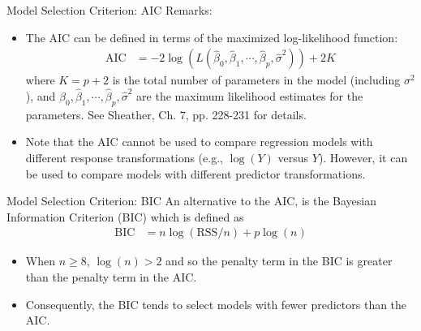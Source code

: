 \documentclass[10pt]{beamer}\usepackage[]{graphicx}\usepackage[]{color}
\newcommand{\AIC}{\text{AIC}}
\newcommand{\BIC}{\text{BIC}}
\newcommand{\RSS}{\text{RSS}}
\newcommand{\hbeta}{\hat{\beta}}
\newcommand{\hsigma}{\hat{\sigma}}
\begin{document}
\begin{frame}{Model Selection Criterion: AIC}
Remarks:
\vspace{10pt}
\begin{itemize}
\item The AIC can be defined in terms of the maximized log-likelihood function:
\begin{align*}
\AIC &= -2 \log(L(\hbeta_0, \hbeta_1, \cdots, \hbeta_p, \hsigma^2)) + 2K
\end{align*}
where $K=p+2$ is the total number of parameters in the model (including $\sigma^2$), and $\hbeta_0, \hbeta_1, \cdots, \hbeta_p, \hsigma^2$ are the maximum likelihood estimates for the parameters.  See Sheather, Ch. 7, pp. 228-231 for details.\\
\vspace{10pt}
\item Note that the AIC cannot be used to compare regression models with different response transformations (e.g., $\log(Y)$ versus $Y$).  However, it can be used to compare models with different predictor transformations.
\end{itemize}
\end{frame}

\begin{frame}{Model Selection Criterion: BIC}
An alternative to the AIC, is the Bayesian Information Criterion (BIC) which is defined as
\begin{align*}
\BIC &=  n \log(\RSS / n) + p \log(n)
\end{align*}
\begin{itemize}
\item When $n \geq 8$, $\log(n) > 2$ and so the penalty term in the BIC is greater than the penalty term in the AIC.
\vspace{5pt}
\item Consequently, the BIC tends to select models with fewer predictors than the AIC.
\end{itemize}
\end{frame}
\end{document}
